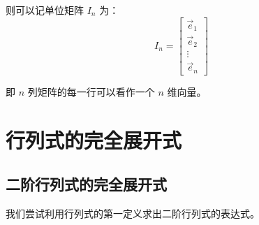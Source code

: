 则可以记单位矩阵 $I_n$ 为：
$$
I_n =
\begin{bmatrix}
	\vec e_1 \\ \vec e_2 \\ \vdots \\ \vec e_n
\end{bmatrix}
$$

即 $n$ 列矩阵的每一行可以看作一个 $n$ 维向量。

\section{行列式的完全展开式}

\subsection{二阶行列式的完全展开式}

我们尝试利用行列式的第一定义求出二阶行列式的表达式。

